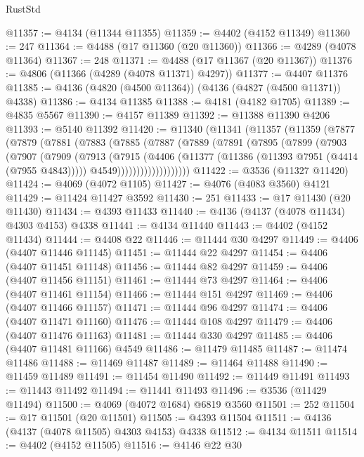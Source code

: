 \begin{lexlean}{RustStd}
\begin{coremodule}
{\begin{coremodule}
{{{{{{{{{{{{{{{{{{{{{{{{{{{{{{{{{{{{{{{{{{{{{{{{{{@11357 := @4134 (@11344 @11355)
@11359 := @4402 (@4152 @11349)
@11360 := 247
@11364 := @4488 (@17 @11360 (@20 @11360))
@11366 := @4289 (@4078 @11364)
@11367 := 248
@11371 := @4488 (@17 @11367 (@20 @11367))
@11376 := @4806 (@11366 (@4289 (@4078 @11371) @4297))
@11377 := @4407 @11376
@11385 := @4136 (@4820 (@4500 @11364)) (@4136 (@4827 (@4500 @11371)) @4338)
@11386 := @4134 @11385
@11388 := @4181 (@4182 @1705)
@11389 := @4835 @5567
@11390 := @4157 @11389
@11392 := @11388 @11390 @4206
@11393 := @5140 @11392
@11420 := @11340
    (@11341
      (@11357
        (@11359
          (@7877
            (@7879
              (@7881
                (@7883
                  (@7885
                    (@7887
                      (@7889
                        (@7891
                          (@7895
                            (@7899
                              (@7903
                                (@7907
                                  (@7909
                                    (@7913
                                      (@7915
                                        (@4406
                                          (@11377 (@11386 (@11393 @7951 (@4414 (@7955 @4843)))))
                                          @4549)))))))))))))))))))
@11422 := @3536 (@11327 @11420)
@11424 := @4069 (@4072 @1105)
@11427 := @4076 (@4083 @3560) @4121
@11429 := @11424 @11427 @3592
@11430 := 251
@11433 := @17 @11430 (@20 @11430)
@11434 := @4393 @11433
@11440 := @4136 (@4137 (@4078 @11434) @4303 @4153) @4338
@11441 := @4134 @11440
@11443 := @4402 (@4152 @11434)
@11444 := @4408 @22
@11446 := @11444 @30 @4297
@11449 := @4406 (@4407 @11446 @11145)
@11451 := @11444 @22 @4297
@11454 := @4406 (@4407 @11451 @11148)
@11456 := @11444 @82 @4297
@11459 := @4406 (@4407 @11456 @11151)
@11461 := @11444 @73 @4297
@11464 := @4406 (@4407 @11461 @11154)
@11466 := @11444 @151 @4297
@11469 := @4406 (@4407 @11466 @11157)
@11471 := @11444 @96 @4297
@11474 := @4406 (@4407 @11471 @11160)
@11476 := @11444 @108 @4297
@11479 := @4406 (@4407 @11476 @11163)
@11481 := @11444 @330 @4297
@11485 := @4406 (@4407 @11481 @11166) @4549
@11486 := @11479 @11485
@11487 := @11474 @11486
@11488 := @11469 @11487
@11489 := @11464 @11488
@11490 := @11459 @11489
@11491 := @11454 @11490
@11492 := @11449 @11491
@11493 := @11443 @11492
@11494 := @11441 @11493
@11496 := @3536 (@11429 @11494)
@11500 := @4069 (@4072 @1684) @6819 @3560
@11501 := 252
@11504 := @17 @11501 (@20 @11501)
@11505 := @4393 @11504
@11511 := @4136 (@4137 (@4078 @11505) @4303 @4153) @4338
@11512 := @4134 @11511
@11514 := @4402 (@4152 @11505)
@11516 := @4146 @22 @30
}}}}}}}}}}}}}}}}}}}}}}}}}}}}}}}}}}}}}}}}}}}}}}}}}}
\end{coremodule}}
\end{coremodule}
\end{lexlean}

